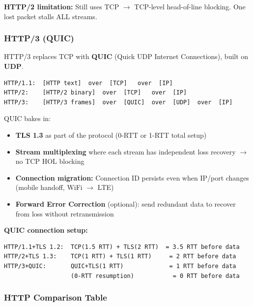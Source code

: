 \documentclass[11pt]{article}
\providecommand{\tightlist}{\setlength{\itemsep}{1pt}\setlength{\parskip}{0pt}}
\begin{document}
\textbf{HTTP/2 limitation:} Still uses TCP \(\rightarrow\) TCP-level head-of-line blocking. One lost packet stalls ALL streams.

\subsubsection{HTTP/3 (QUIC)}\label{http3-quic}

HTTP/3 replaces TCP with \textbf{QUIC} (Quick UDP Internet Connections), built on \textbf{UDP}.

\setcodelang{}

\begin{verbatim}
HTTP/1.1:  [HTTP text]  over  [TCP]   over  [IP]
HTTP/2:    [HTTP/2 binary]  over  [TCP]   over  [IP]
HTTP/3:    [HTTP/3 frames]  over  [QUIC]  over  [UDP]  over  [IP]
\end{verbatim}

QUIC bakes in:

\begin{itemize}
\tightlist
\item
  \textbf{TLS 1.3} as part of the protocol (0-RTT or 1-RTT total setup)
\item
  \textbf{Stream multiplexing} where each stream has independent loss recovery \(\rightarrow\) no TCP HOL blocking
\item
  \textbf{Connection migration:} Connection ID persists even when IP/port changes (mobile handoff, WiFi \(\rightarrow\) LTE)
\item
  \textbf{Forward Error Correction} (optional): send redundant data to recover from loss without retransmission
\end{itemize}

\textbf{QUIC connection setup:}

\setcodelang{}

\begin{verbatim}
HTTP/1.1+TLS 1.2:  TCP(1.5 RTT) + TLS(2 RTT)  = 3.5 RTT before data
HTTP/2+TLS 1.3:    TCP(1 RTT) + TLS(1 RTT)     = 2 RTT before data
HTTP/3+QUIC:       QUIC+TLS(1 RTT)             = 1 RTT before data
                   (0-RTT resumption)           = 0 RTT before data
\end{verbatim}

\subsubsection{HTTP Comparison Table}\label{http-comparison-table}
\end{document}
